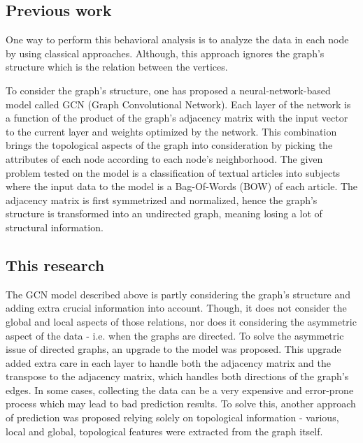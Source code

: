 \subsection*{Previous work}
One way to perform this behavioral analysis is to analyze the data in each node by using classical approaches.
Although, this approach ignores the graph’s structure which is the relation between the vertices.

To consider the graph's structure, one has proposed a neural-network-based model called GCN (Graph Convolutional Network). Each layer of the network is a function of the product of the graph's adjacency matrix with the input vector to the current layer and weights optimized by the network. This combination brings the topological aspects of the graph into consideration by picking the attributes of each node according to each node's neighborhood. The given problem tested on the model is a classification of textual articles into subjects where the input data to the model is a Bag-Of-Words (BOW) of each article. The adjacency matrix is first symmetrized and normalized, hence the graph's structure is transformed into an undirected graph, meaning losing a lot of structural information.

\subsection*{This research}
The GCN model described above is partly considering the graph's structure and adding extra crucial information into account. Though, it does not consider the global and local aspects of those relations, nor does it considering the asymmetric aspect of the data - i.e. when the graphs are directed.
To solve the asymmetric issue of directed graphs, an upgrade to the model was proposed. This upgrade added extra care in each layer to handle both the adjacency matrix and the transpose to the adjacency matrix, which handles both directions of the graph's edges.
In some cases, collecting the data can be a very expensive and error-prone process which may lead to bad prediction results.
To solve this, another approach of prediction was proposed relying solely on topological information - various, local and global, topological features were extracted from the graph itself.

